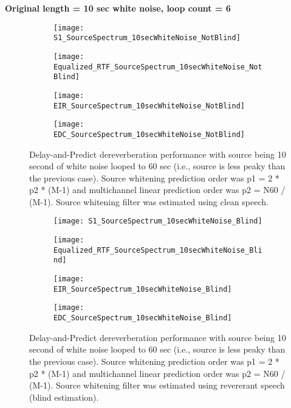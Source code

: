 \textbf{Original length = 10 sec white noise, loop count = 6}

\begin{figure}[H]
	\centering
	\begin{subfigure}[b]{0.49\textwidth}
		\centering
		\texttt{[image: S1\_SourceSpectrum\_10secWhiteNoise\_NotBlind]}
	\end{subfigure}
	\hfill
	\begin{subfigure}[b]{0.49\textwidth}
		\centering
		\texttt{[image: Equalized\_RTF\_SourceSpectrum\_10secWhiteNoise\_NotBlind]}
	\end{subfigure}
	\hfill
	\begin{subfigure}[b]{0.49\textwidth}
		\centering
		\texttt{[image: EIR\_SourceSpectrum\_10secWhiteNoise\_NotBlind]}
	\end{subfigure}
	\hfill
	\begin{subfigure}[b]{0.49\textwidth}
		\centering
		\texttt{[image: EDC\_SourceSpectrum\_10secWhiteNoise\_NotBlind]}
	\end{subfigure}
	\hfill
	\caption{Delay-and-Predict dereverberation performance with source being 10 second of white noise looped to 60 sec (i.e., source is less peaky than the previous case). Source whitening prediction order was p1 = 2 * p2 * (M-1) and multichannel linear prediction order was p2 = N60 / (M-1). Source whitening filter was estimated using clean speech.}
	\label{fig:params_source_spectrum_10sec_not_blind}
\end{figure}

\begin{figure}[H]
	\centering
	\begin{subfigure}[b]{0.49\textwidth}
		\centering
		\texttt{[image: S1\_SourceSpectrum\_10secWhiteNoise\_Blind]}
	\end{subfigure}
	\hfill
	\begin{subfigure}[b]{0.49\textwidth}
		\centering
		\texttt{[image: Equalized\_RTF\_SourceSpectrum\_10secWhiteNoise\_Blind]}
	\end{subfigure}
	\hfill
	\begin{subfigure}[b]{0.49\textwidth}
		\centering
		\texttt{[image: EIR\_SourceSpectrum\_10secWhiteNoise\_Blind]}
	\end{subfigure}
	\hfill
	\begin{subfigure}[b]{0.49\textwidth}
		\centering
		\texttt{[image: EDC\_SourceSpectrum\_10secWhiteNoise\_Blind]}
	\end{subfigure}
	\hfill
	\caption{Delay-and-Predict dereverberation performance with source being 10 second of white noise looped to 60 sec (i.e., source is less peaky than the previous case). Source whitening prediction order was p1 = 2 * p2 * (M-1) and multichannel linear prediction order was p2 = N60 / (M-1). Source whitening filter was estimated using revererant speech (blind estimation).}
	\label{fig:params_source_spectrum_10sec_blind}
\end{figure}


